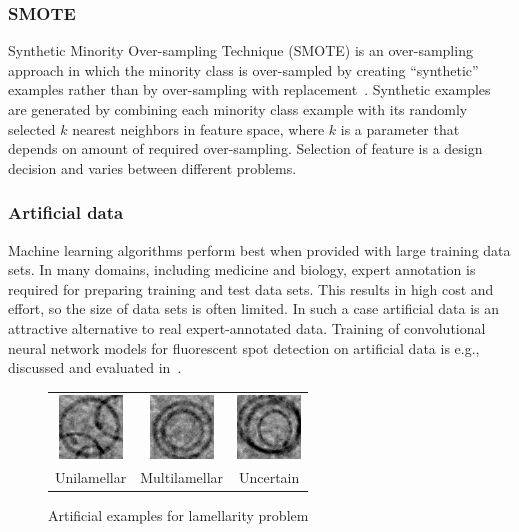 \documentclass[a4paper, 11pt, table]{article}
\begin{document}
\subsubsection{SMOTE}
Synthetic Minority Over-sampling Technique (SMOTE) is an over-sampling approach in which the minority class is over-sampled by creating “synthetic” examples rather than by over-sampling with replacement~\cite{smote_chawla}. 
Synthetic examples are generated by combining each minority class example with its randomly selected $k$ nearest neighbors in feature space, where $k$ is a parameter that depends on amount of required over-sampling. Selection of feature is a design decision and varies between different problems.

\subsubsection{Artificial data}
Machine learning algorithms perform best when provided with large training data sets. In many domains, including medicine and biology, expert annotation is required for preparing training and test data sets. This results in high cost and effort, so the size of data sets is often limited. In such a case artificial data is an attractive alternative to real expert-annotated data. Training of convolutional neural network models for fluorescent spot detection on artificial data is e.g., discussed and evaluated in~\cite{ishaq_synthetic}. 

\begin{figure}[H]
\centering
\begin{tabular}{ccc}
	\includegraphics[scale=1.5]{synthetic/uni.png} & \includegraphics[scale=1.5]{synthetic/multi.png} & \includegraphics[scale=1.5]{synthetic/uncertain.png} \\
	Unilamellar & Multilamellar & Uncertain \\[6pt]
\end{tabular}
\caption{Artificial examples for lamellarity problem}
\label{fig:synthetic_images}
\end{figure}
\end{document}
